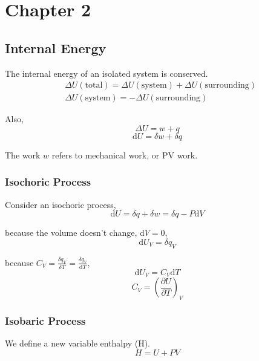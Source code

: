 \documentclass[letterpaper]{article}
\newcommand{\diff}{\mathrm{d}}
\begin{document}
\newpage
\section*{Chapter 2}
\subsection*{Internal Energy}
The internal energy of an isolated system is conserved.
\begin{equation*}
    \begin{aligned}
        &\Delta U(\mathrm{total})=\Delta U(\mathrm{system})+\Delta U(\mathrm{surrounding})\\
        &\Delta U(\mathrm{system})=-\Delta U(\mathrm{surrounding})
    \end{aligned}
\end{equation*}

Also,
\begin{equation*}
    \Delta U=w+q
\end{equation*}
\begin{equation*}
    \diff U=\delta w+\delta q
\end{equation*}

The work $w$ refers to mechanical work, or PV work.
\subsubsection*{Isochoric Process}
Consider an isochoric process,
\begin{equation*}
    \diff U=\delta q + \delta w = \delta q - P\diff V
\end{equation*}

because the volume doesn't change, d$V=0$,
\begin{equation*}
    \diff U_V=\delta q_V
\end{equation*}

because $C_V=\frac{\delta q_V}{\delta T}=\frac{\delta q_V}{\diff T}$,
\begin{equation*}
    \diff U_V=C_V\diff T
\end{equation*}
\begin{equation*}
    \boxed{C_V=(\frac{\partial U}{\partial T})_V}
\end{equation*}
\subsubsection*{Isobaric Process}
We define a new variable enthalpy (H).
\begin{equation*}
    H=U+PV
\end{equation*}
\end{document}
